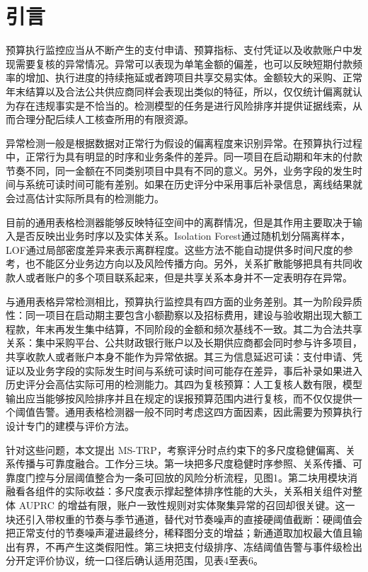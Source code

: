 \documentclass[a4paper,fleqn]{cas-dc}
\begin{document}
\section{引言}
预算执行监控应当从不断产生的支付申请、预算指标、支付凭证以及收款账户中发现需要复核的异常情况。异常可以表现为单笔金额的偏差，也可以反映短期付款频率的增加、执行进度的持续拖延或者跨项目共享交易实体。金额较大的采购、正常年末结算以及合法公共供应商同样会表现出类似的特征，所以，仅仅统计偏离就认为存在违规事实是不恰当的。检测模型的任务是进行风险排序并提供证据线索，从而合理分配后续人工核查所用的有限资源。

异常检测一般是根据数据对正常行为假设的偏离程度来识别异常\cite{ref1}。在预算执行过程中，正常行为具有明显的时序和业务条件的差异。同一项目在启动期和年末的付款节奏不同，同一金额在不同类别项目中具有不同的意义。另外，业务字段的发生时间与系统可读时间可能有差别。如果在历史评分中采用事后补录信息，离线结果就会过高估计实际所具有的检测能力。

目前的通用表格检测器能够反映特征空间中的离群情况，但是其作用主要取决于输入是否反映出业务时序以及实体关系。Isolation Forest通过随机划分隔离样本\cite{ref2}，LOF通过局部密度差异来表示离群程度\cite{ref3}。这些方法不能自动提供多时间尺度的参考，也不能区分业务边方向以及风险传播方向。另外，关系扩散能够把具有共同收款人或者账户的多个项目联系起来，但是共享关系本身并不一定表明存在异常。

与通用表格异常检测相比，预算执行监控具有四方面的业务差别。其一为阶段异质性：同一项目在启动期主要包含小额勘察以及招标费用，建设与验收期出现大额工程款，年末再发生集中结算，不同阶段的金额和频次基线不一致。其二为合法共享关系：集中采购平台、公共财政银行账户以及长期供应商都会同时参与许多项目，共享收款人或者账户本身不能作为异常依据。其三为信息延迟可读：支付申请、凭证以及业务字段的实际发生时间与系统可读时间可能存在差异，事后补录如果进入历史评分会高估实际可用的检测能力。其四为复核预算：人工复核人数有限，模型输出应当能够按风险排序并且在规定的误报预算范围内进行复核，而不仅仅提供一个阈值告警。通用表格检测器一般不同时考虑这四方面因素，因此需要为预算执行设计专门的建模与评价方法。

针对这些问题，本文提出 MS-TRP，考察评分时点约束下的多尺度稳健偏离、关系传播与可靠度融合。工作分三块。第一块把多尺度稳健时序参照、关系传播、可靠度门控与分层阈值整合为一条可回放的风险分析流程，见图1。第二块用模块消融看各组件的实际收益：多尺度表示撑起整体排序性能的大头，关系相关组件对整体 AUPRC 的增益有限，账户一致性规则对实体聚集异常的召回却很关键。这一块还引入带权重的节奏与季节通道，替代对节奏噪声的直接硬阈值截断：硬阈值会把正常支付的节奏噪声灌进最终分，稀释图分支的增益；新通道取加权最大值且输出有界，不再产生这类假阳性。第三块把支付级排序、冻结阈值告警与事件级检出分开定评价协议，统一口径后确认适用范围，见表4至表6。
\end{document}
